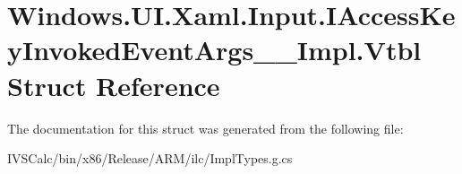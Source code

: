 \hypertarget{struct_windows_1_1_u_i_1_1_xaml_1_1_input_1_1_i_access_key_invoked_event_args_____impl_1_1_vtbl}{}\section{Windows.\+U\+I.\+Xaml.\+Input.\+I\+Access\+Key\+Invoked\+Event\+Args\+\_\+\+\_\+\+Impl.\+Vtbl Struct Reference}
\label{struct_windows_1_1_u_i_1_1_xaml_1_1_input_1_1_i_access_key_invoked_event_args_____impl_1_1_vtbl}


The documentation for this struct was generated from the following file\+:\begin{DoxyCompactItemize}
\item 
I\+V\+S\+Calc/bin/x86/\+Release/\+A\+R\+M/ilc/Impl\+Types.\+g.\+cs\end{DoxyCompactItemize}
